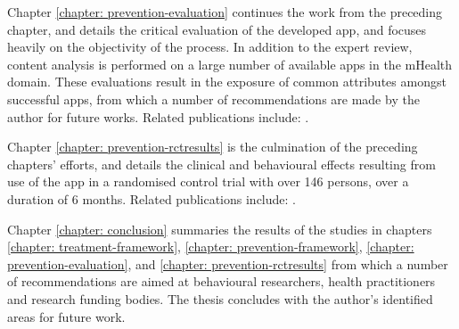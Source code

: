 Chapter \ref{chapter: prevention-evaluation} continues the work from the preceding chapter, and details the  critical evaluation of the developed app, and focuses heavily on the objectivity of the process. In addition to the expert review, content analysis is performed on a large number of available apps in the mHealth domain. These evaluations result in the exposure of common attributes amongst successful apps, from which a number of recommendations are made by the author for future works. 
Related publications include: \cite{Hartin2016-EMBC, Hartin2015-JMIR, Hartin2014-IWAAL, Hartin2015-ICOST, Hartin2014-AAIC, Hartin2015-AAIC, Hartin2015-mHealth, Norton2015-TRCI, Norton2015-AAIC, Weyerman2015}.

Chapter \ref{chapter: prevention-rctresults} is the culmination of the preceding chapters' efforts, and details the clinical and behavioural effects resulting from use of the app in a randomised control trial with over 146 persons, over a duration of 6 months. 
Related publications include: \cite{Hartin2015-JMIR, Hartin2014-IWAAL, Hartin2015-ICOST, Hartin2014-AAIC, Hartin2015-AAIC, Hartin2015-mHealth, Norton2015-TRCI, Norton2015-AAIC, Weyerman2015}.

Chapter \ref{chapter: conclusion} summaries the results of the studies in chapters \ref{chapter: treatment-framework}, \ref{chapter: prevention-framework}, \ref{chapter: prevention-evaluation}, and \ref{chapter: prevention-rctresults} from which a number of recommendations are aimed at behavioural researchers, health practitioners and research funding bodies. The thesis concludes with the author's identified areas for future work.
